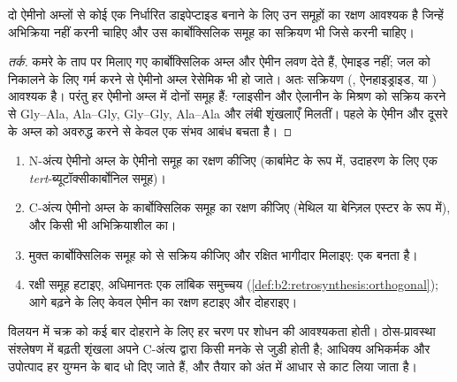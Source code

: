 \begin{proposition}[रक्षण और सक्रियण क्यों]\label{prop:b2:biomolecules:coupling}
दो ऐमीनो अम्लों से कोई एक निर्धारित डाइपेप्टाइड बनाने के लिए उन समूहों का रक्षण आवश्यक है जिन्हें
अभिक्रिया नहीं करनी चाहिए और उस कार्बोक्सिलिक समूह का सक्रियण भी जिसे करनी चाहिए।
\end{proposition}

\begin{proof}[तर्क]
कमरे के ताप पर मिलाए गए कार्बोक्सिलिक अम्ल और ऐमीन लवण देते हैं, ऐमाइड नहीं; जल को निकालने के लिए गर्म करने से
ऐमीनो अम्ल रेसेमिक भी हो जाते। अतः सक्रियण (, ऐनहाइड्राइड, या ) आवश्यक है। परंतु हर ऐमीनो अम्ल में दोनों समूह हैं: ग्लाइसीन और
ऐलानीन के मिश्रण को सक्रिय करने से Gly--Ala, Ala--Gly, Gly--Gly, Ala--Ala और लंबी शृंखलाएँ मिलतीं। पहले के
ऐमीन और दूसरे के अम्ल को अवरुद्ध करने से केवल एक संभव आबंध बचता है।
\end{proof}

\begin{method}[डाइपेप्टाइड का संश्लेषण]\label{met:b2:biomolecules:peptide}
\begin{enumerate}
  \item N-अंत्य ऐमीनो अम्ल के ऐमीनो समूह का रक्षण कीजिए (कार्बामेट के रूप में, उदाहरण के लिए एक
        \textit{tert}-ब्यूटॉक्सीकार्बोनिल समूह)।
  \item C-अंत्य ऐमीनो अम्ल के कार्बोक्सिलिक समूह का रक्षण कीजिए (मेथिल या बेन्ज़िल एस्टर के रूप में), और किसी भी
        अभिक्रियाशील  का।
  \item मुक्त कार्बोक्सिलिक समूह को  से सक्रिय कीजिए और रक्षित भागीदार मिलाइए: एक
         बनता है।
  \item रक्षी समूह हटाइए, अधिमानतः एक लांबिक समुच्चय
        (\cref{def:b2:retrosynthesis:orthogonal}); आगे बढ़ने के लिए केवल ऐमीन का रक्षण हटाइए और दोहराइए।
\end{enumerate}
\end{method}

विलयन में चक्र को कई बार दोहराने के लिए हर चरण पर शोधन की आवश्यकता होती। ठोस-प्रावस्था
संश्लेषण में बढ़ती शृंखला अपने C-अंत्य द्वारा किसी  मनके से जुड़ी होती है; आधिक्य अभिकर्मक और
उपोत्पाद हर युग्मन के बाद धो दिए जाते हैं, और तैयार  को अंत में आधार से
काट लिया जाता है।

